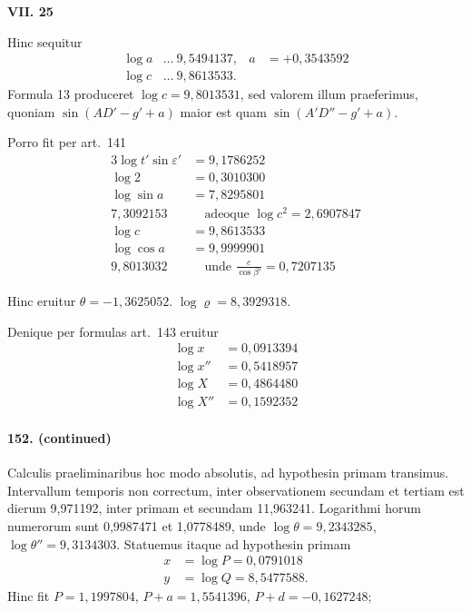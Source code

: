 \documentclass[12pt,a4paper]{article}
\begin{document}
\begin{center}
\textbf{VII. 25}
\end{center}


Hinc sequitur
\begin{align*}
\log a &\ldots\ 9,5494137, & a &= +0,3543592\\
\log c &\ldots\ 9,8613533.
\end{align*}
Formula 13 produceret $\log c = 9,8013531$, sed valorem illum praeferimus, quoniam $\sin(AD' - g' + a)$ maior est quam $\sin(A'D'' - g' + a)$.

Porro fit per art.~141
\begin{align*}
3\log t'\sin\varepsilon' &= 9,1786252\\
\log 2 &= 0,3010300\\
\log\sin a &= 7,8295801\\
\hline
7,3092153 &\quad \text{adeoque } \log c^2 = 2,6907847\\
\log c &= 9,8613533\\
\log\cos a &= 9,9999901\\
\hline
9,8013032 &\quad \text{unde } \tfrac{c}{\cos\beta'} = 0,7207135
\end{align*}

Hinc eruitur $\theta = -1,3625052$. $\log\varrho = 8,3929318$.

Denique per formulas art.~143 eruitur
\begin{align*}
\log x &= 0,0913394\\
\log x'' &= 0,5418957\\
\log X &= 0,4864480\\
\log X'' &= 0,1592352
\end{align*}

\paragraph{152. (continued)}
Calculis praeliminaribus hoc modo absolutis, ad hypothesin primam transimus. Intervallum temporis non correctum, inter observationem secundam et tertiam est dierum 9,971192, inter primam et secundam 11,963241. Logarithmi horum numerorum sunt 0,9987471 et 1,0778489, unde $\log\theta = 9,2343285$, $\log\theta'' = 9,3134303$. Statuemus itaque ad hypothesin primam
\begin{align*}
x &= \log P = 0,0791018\\
y &= \log Q = 8,5477588.
\end{align*}
Hinc fit $P = 1,1997804$, $P + a = 1,5541396$, $P + d = -0,1627248$;
\end{document}

